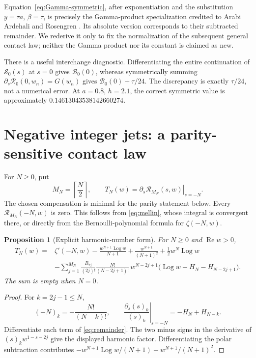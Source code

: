 \documentclass[11pt,a4paper]{article}
\numberwithin{equation}{section}
\newtheorem{proposition}[theorem]{Proposition}
\theoremstyle{definition}
\theoremstyle{remark}
\DeclareMathOperator{\Log}{Log}
\DeclareMathOperator{\Ree}{Re}
\newcommand{\Rcal}{\mathcal R}
\newcommand{\Bcal}{\mathcal B}
\newcommand{\Scal}{\mathcal S}
\begin{document}
Equation~\eqref{eq:Gamma-symmetric}, after exponentiation and the
substitution $y=\tau a$, $\beta=\tau$, is precisely the Gamma-product
specialization credited to Arabi Ardehali and Rosengren
\cite[Eq.~(13)]{ArdehaliRosengren}. Its absolute version corresponds
to their subtracted remainder. We rederive it only to fix the
normalization of the subsequent general contact law; neither the
Gamma product nor its constant is claimed as new.

There is a useful interchange diagnostic. Differentiating the entire
continuation of $\Scal_0(s)$ at $s=0$ gives
$\Bcal_0(0)$, whereas symmetrically summing
$\partial_s\Rcal_0(0,w_n)=G(w_n)$ gives
$\Bcal_0(0)+\tau/24$. The discrepancy is exactly $\tau/24$, not a
numerical error. At $a=0.8$, $h=2.1$, the correct symmetric value is
approximately $0.14613043538142660274$.

\section{Negative integer jets: a parity-sensitive contact law}
\label{sec:negative}

For $N\ge0$, put
\begin{equation}\label{eq:T-definition}
 M_N=\left\lceil\frac N2\right\rceil,
 \qquad T_N(w)=\left.\partial_s\Rcal_{M_N}(s,w)\right|_{s=-N}.
\end{equation}
The chosen compensation is minimal for the parity statement below.
Every $\Rcal_{M_N}(-N,w)$ is zero. This follows from
\eqref{eq:mellin}, whose integral is convergent there, or directly
from the Bernoulli-polynomial formula for $\zeta(-N,w)$.

\begin{proposition}[Explicit harmonic-number form]\label{prop:T-explicit}
For $N\ge0$ and $\Ree w>0$,
\begin{equation}\label{eq:T-explicit}
 \begin{split}
 T_N(w)={}&\zeta'(-N,w)-\frac{w^{N+1}\Log w}{N+1}
                   +\frac{w^{N+1}}{(N+1)^2}
                   +\frac12w^N\Log w\\
 &-\sum_{j=1}^{M_N}\frac{B_{2j}}{(2j)!}
    \frac{N!}{(N-2j+1)!}\,w^{N-2j+1}
    \bigl(\Log w+H_N-H_{N-2j+1}\bigr).
 \end{split}
\end{equation}
The sum is empty when $N=0$.
\end{proposition}
\begin{proof}
For $k=2j-1\le N$,
\[
 (-N)_k=-\frac{N!}{(N-k)!},\qquad
 \left.\frac{\partial_s(s)_k}{(s)_k}\right|_{s=-N}
       =-H_N+H_{N-k}.
\]
Differentiate each term of \eqref{eq:remainder}. The two minus signs
in the derivative of $(s)_k w^{1-s-2j}$ give the displayed
harmonic factor. Differentiating the polar subtraction contributes
$-w^{N+1}\Log w/(N+1)+w^{N+1}/(N+1)^2$.
\end{proof}
\end{document}
